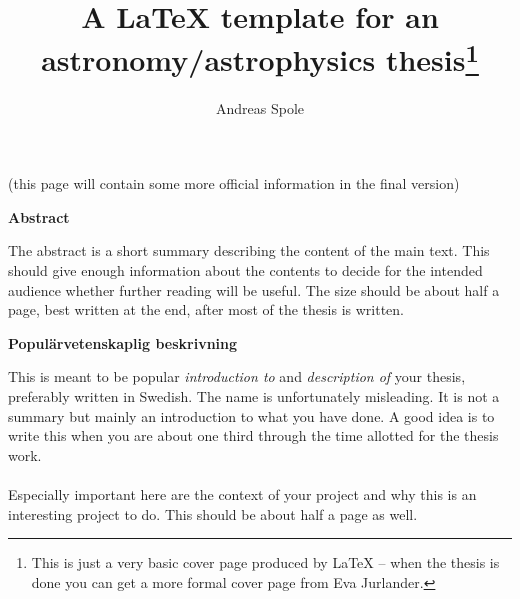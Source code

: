 \documentclass[12pt]{report}
\begin{document}
\title{\huge \bf A LaTeX template for an astronomy/astrophysics
thesis\footnote{This is just a very basic cover page produced by LaTeX -- when
the thesis is done you can get a more formal cover page from Eva Jurlander.}}
\author{Andreas Spole}

\thispagestyle{empty} %

\maketitle

\newpage

\thispagestyle{empty}

\begin{center}
  (this page will contain some more official information in the final version)
\end{center}

\newpage

\thispagestyle{empty}

\begin{center}
  {\bf Abstract}
\end{center}
The abstract is a short summary describing the content of the main text. This
should give enough information about the contents to decide for the intended
audience whether further reading will be useful. The size should be about half
a page, best written at the end, after most of the thesis is written.

\newpage

\thispagestyle{empty}
\mbox{} %

\newpage

\thispagestyle{empty}

\begin{center}
  {\bf Popul\"arvetenskaplig beskrivning}
\end{center}
This is meant to be popular {\it introduction to} and {\it description of} your
thesis, preferably written in Swedish. The name is unfortunately misleading. It
is not a summary but mainly an introduction to what you have done. A good idea
is to write this when you are about one third through the time allotted for the
thesis work.
\\ \\
Especially important here are the context of your project and why this is an
interesting project to do. This should be about half a page as well.

\newpage
\end{document}
